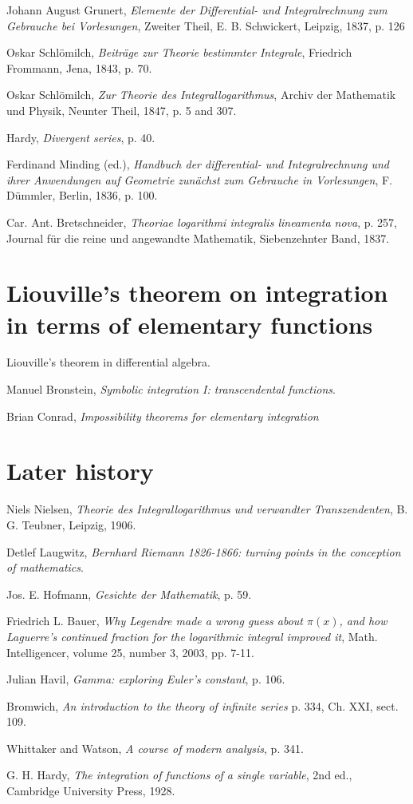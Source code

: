 \documentclass{amsart}
\begin{document}
Johann August Grunert,
{\em Elemente der Differential- und Integralrechnung zum Gebrauche
bei Vorlesungen}, Zweiter Theil, E. B. Schwickert, Leipzig, 1837,
p. 126

Oskar Schl\"omilch, {\em Beitr\"age zur Theorie bestimmter Integrale},
Friedrich Frommann, Jena, 1843, p. 70.

Oskar Schl\"omilch, {\em Zur Theorie des Integrallogarithmus},
Archiv der Mathematik und Physik,
Neunter Theil, 1847, p. 5 and 307.

Hardy, {\em Divergent series}, p. 40.

Ferdinand Minding (ed.), {\em Handbuch der differential- und Integralrechnung
und ihrer Anwendungen auf Geometrie zun\"achst zum Gebrauche in Vorlesungen},
F. D\"ummler, Berlin, 1836, p. 100.

Car. Ant. Bretschneider, {\em Theoriae logarithmi integralis lineamenta nova},
p. 257,
Journal f\"ur die reine und angewandte Mathematik, 
Siebenzehnter Band, 1837.

\section{Liouville's theorem on integration in terms of elementary functions}
Liouville's theorem in differential algebra.

Manuel Bronstein, {\em Symbolic integration I: transcendental functions}.

Brian Conrad, {\em Impossibility theorems for elementary integration}

\section{Later history}
Niels Nielsen, {\em Theorie des Integrallogarithmus und verwandter
Transzendenten}, B. G. Teubner, Leipzig, 1906.

Detlef Laugwitz, {\em Bernhard Riemann 1826-1866: turning points in the
conception of mathematics}.

Jos. E. Hofmann, {\em Gesichte der Mathematik}, p. 59.

Friedrich L. Bauer, {\em Why Legendre made a wrong guess about $\pi(x)$, and
how Laguerre's continued fraction for the logarithmic integral improved it},
Math. Intelligencer, volume 25, number 3, 2003, pp. 7-11.

Julian Havil, {\em Gamma: exploring Euler's constant}, p. 106.

Bromwich,
{\em An introduction to the theory of infinite series}
p. 334, Ch. XXI, sect. 109.

Whittaker and Watson, {\em A course of modern analysis}, p. 341.

G. H. Hardy,
{\em The integration of functions of a single variable},
2nd ed., Cambridge University Press, 1928.
\end{document}
